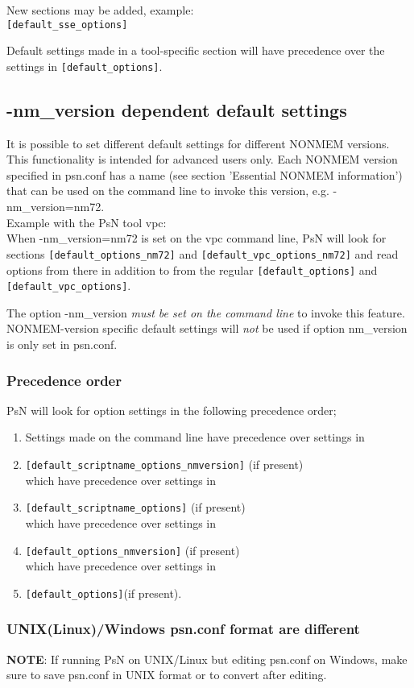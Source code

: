 \noindent New sections may be added, example:\\
\verb|[default_sse_options]|

\noindent Default settings made in a tool-specific section will have precedence over the settings in \verb|[default_options]|.

\subsection{-nm\_version dependent default settings}
It is possible to set different default settings for different NONMEM versions. This functionality is intended for advanced users only. Each NONMEM version specified in psn.conf has a name (see section 'Essential NONMEM information') that can be used on the command line to invoke this version, e.g. -nm\_version=nm72.\\
Example with the PsN tool vpc:\\
When -nm\_version=nm72 is set on the vpc command line, PsN will look for sections \verb|[default_options_nm72]| 
and \verb|[default_vpc_options_nm72]| and read options from there in addition to from the regular \verb|[default_options]| and \verb|[default_vpc_options]|. 

The option -nm\_version \emph{must be set on the command line} to invoke this feature. NONMEM-version specific default settings will \emph{not} be used if option nm\_version is only set in psn.conf.
\subsubsection*{Precedence order}
PsN will look for option settings in the following precedence order;
\begin{enumerate}
\item Settings made on the command line have precedence over settings in
\item \verb|[default_scriptname_options_nmversion]| (if present)\\
which have precedence over settings in
\item \verb|[default_scriptname_options]| (if present)\\
which have precedence over settings in
\item \verb|[default_options_nmversion]| (if present)\\
which have precedence over settings in
\item \verb|[default_options]|(if present). 
\end{enumerate}
\subsubsection*{UNIX(Linux)/Windows psn.conf format are different}
\textbf{NOTE}: If running PsN on UNIX/Linux but editing psn.conf on Windows, make sure to save psn.conf in UNIX format or to convert after editing.
\newpage

